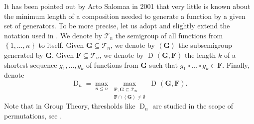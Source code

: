 \documentclass{ws-ijmpc}
\DeclareMathOperator{\D}{D}
\DeclareMathOperator{\Df}{D\!}
\begin{document}
It has been pointed out by Arto Salomaa \citep{SAL4} in 2001 that
very little is known about the minimum length of a composition needed
to generate a function by a given set of generators. To be more precise,
let us adopt and slightly extend the notation used in \citep{SAL4}.
We denote by $\mathcal{T}_{n}$ the semigroup of all functions from
$\left\{ 1,\dots,n\right\} $ to itself. Given $\mathbf{G}\subseteq\mathcal{T}_{n}$,
we denote by $\left\langle \mathbf{G}\right\rangle $ the subsemigroup
generated by $\mathbf{G}$. Given $\mathbf{F}\subseteq\mathcal{T}_{n}$,
we denote by $\Df\left(\mathbf{G},\mathbf{F}\right)$ the length $k$
of a shortest sequence $g_{1},\dots,g_{k}$ of functions from $\mathbf{G}$
such that $g_{1}\circ\dots\circ g_{k}\in\mathbf{F}$. Finally, denote
\begin{equation}
\D_{n}=\max_{\overline{n}\leq n}\max_{\substack{\mathbf{\mathbf{F},\mathbf{G}\subseteq\mathcal{T}_{\overline{n}}}\\
\mathbf{F}\cap\left\langle \mathbf{G}\right\rangle \neq\emptyset
}
}\Df\left(\mathbf{G},\mathbf{F}\right).\label{eq: def Dn}
\end{equation}
Note that in Group Theory, thresholds like $\D_{n}$ are studied in
the scope of permutations, see \citep{HEL1}. 
\end{document}
